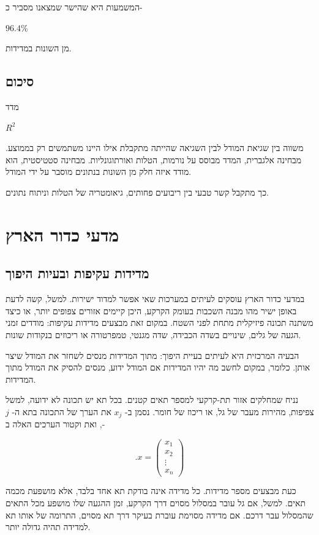 \documentclass[12pt]{report}
\theoremstyle{plain}
\theoremstyle{definition}
\newcommand{\0}{\mathbf{0}}
\begin{document}
המשמעות היא שהישר שמצאנו מסביר כ-

$
96.4\%
$

מן השונות במדידות.

\subsection*{סיכום}

מדד

$
R^2
$

משווה בין שגיאת המודל לבין השגיאה שהייתה מתקבלת אילו היינו משתמשים רק בממוצע.
מבחינה אלגברית, המדד מבוסס על נורמות, הטלות ואורתוגונליות.
מבחינה סטטיסטית, הוא מודד איזה חלק מן השונות בנתונים מוסבר על ידי המודל.

כך מתקבל קשר טבעי בין ריבועים פחותים, גיאומטריה של הטלות וניתוח נתונים.



\section{מדעי כדור הארץ}

\subsection*{מדידות עקיפות ובעיות היפוך}

במדעי כדור הארץ עוסקים לעיתים במערכות שאי אפשר למדוד ישירות. למשל, קשה לדעת באופן ישיר מהו מבנה השכבות בעומק הקרקע, היכן קיימים אזורים צפופים יותר, או כיצד משתנה תכונה פיזיקלית מתחת לפני השטח.
במקום זאת מבצעים מדידות עקיפות: מודדים זמני הגעה של גלים, שינויים בשדה הכבידה, שדה מגנטי, טמפרטורה או ריכוזים בנקודות שונות.

הבעיה המרכזית היא לעיתים בעיית היפוך: מתוך המדידות מנסים לשחזר את המודל שיצר אותן. כלומר, במקום לחשב מה יהיו המדידות אם המודל ידוע, מנסים להסיק את המודל מתוך המדידות.

נניח שמחלקים אזור תת-קרקעי למספר תאים קטנים. בכל תא יש תכונה לא ידועה, למשל צפיפות, מהירות מעבר של גל, או ריכוז של חומר.
נסמן ב-
$x_j$
את הערך של התכונה בתא ה-
$j$,
ואת וקטור הערכים האלה ב-

$$
.x =
\begin{pmatrix}
x_1\\
x_2\\
\vdots\\
x_n
\end{pmatrix}
$$

כעת מבצעים מספר מדידות. כל מדידה אינה בודקת תא אחד בלבד, אלא מושפעת מכמה תאים. למשל, אם גל עובר במסלול מסוים דרך הקרקע, זמן ההגעה שלו מושפע מכל התאים שהמסלול עבר דרכם. אם מדידה מסוימת עוברת בעיקר דרך תא מסוים, התרומה של אותו תא למדידה תהיה גדולה יותר.
\end{document}
